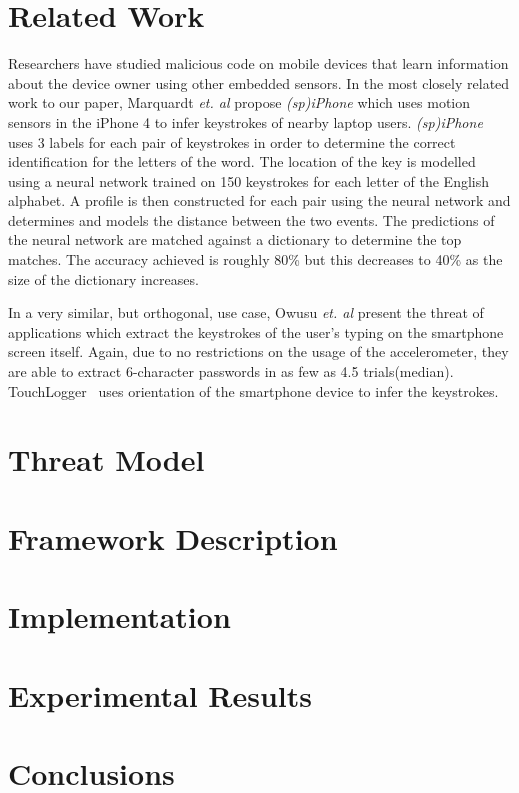 \documentclass{acm_proc_article-sp}
\begin{document}
\section{Related Work}
Researchers have studied malicious code on mobile devices that
learn information about the device owner using other embedded sensors.
In the most closely related work to our paper, Marquardt \emph{et. al}
\cite{spiphone} propose \emph{(sp)iPhone} which uses motion sensors in the
iPhone 4
to infer keystrokes of nearby laptop users. \emph{(sp)iPhone} uses 3 labels for
each pair of keystrokes in order to determine the correct identification for
the letters of the word. The location of the key is modelled using a neural
network trained on 150 keystrokes for each letter of the English alphabet.
A profile is then constructed for each pair using the neural network and
determines and models the distance between the two events. The predictions
of the neural network are matched against a dictionary to determine the top
matches. The accuracy achieved is roughly 80\% but this decreases to 40\%
as the size of the dictionary increases.

In a very similar, but orthogonal, use case, Owusu \emph{et. al}
\cite{owusu2012accessory}
present the threat of applications which extract the keystrokes of the
user's typing on the smartphone screen itself. Again, due to no restrictions
on the usage of the accelerometer, they are able to extract 6-character
passwords in as few as 4.5 trials(median). TouchLogger~\cite{cai2011touchlogger}
uses orientation of the smartphone device to infer the keystrokes.

\section{Threat Model}

\section{Framework Description}

\section{Implementation}

\section{Experimental Results}


\section{Conclusions}
\end{document}
